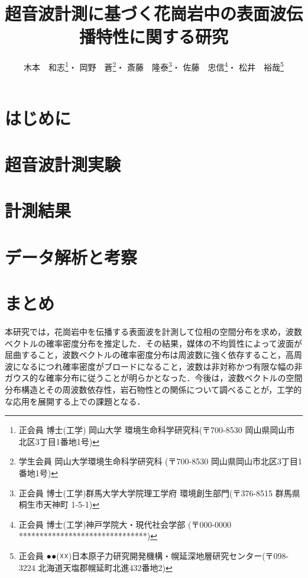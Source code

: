 \documentclass{jsce}
\title{
	超音波計測に基づく花崗岩中の表面波伝播特性に関する研究
}%
\author{木本　和志\thanks{正会員 博士(工学) 岡山大学 環境生命科学研究科(〒700-8530 岡山県岡山市北区3丁目1番地1号)\email{kimoto@cc.okayama-u.ac.jp}}・
岡野　蒼\thanks{学生会員 岡山大学環境生命科学研究科 (〒700-8530 岡山県岡山市北区3丁目1番地1号)}・
斎藤　隆泰\thanks{正会員 博士(工学)群馬大学大学院理工学府 環境創生部門(〒376-8515 群馬県桐生市天神町 1-5-1)}・
佐藤　忠信\thanks{正会員 博士(工学)神戸学院大・現代社会学部 (〒000-0000 *******************************)}・
松井　裕哉\thanks{正会員 ●●(☓☓)日本原子力研究開発機構・幌延深地層研究センター(〒098-3224 北海道天塩郡幌延町北進432番地2)}
}
\begin{document}
\maketitle
\section{はじめに}
	
\section{超音波計測実験}
	
\section{計測結果}
	
\section{データ解析と考察 }
	
\section{まとめ}
本研究では，花崗岩中を伝播する表面波を計測して位相の空間分布を求め，波数ベクトルの確率密度分布を推定した．その結果，媒体の不均質性によって波面が屈曲すること，波数ベクトルの確率密度分布は周波数に強く依存すること，高周波になるにつれ確率密度がブロードになること，波数は非対称かつ有限な幅の非ガウス的な確率分布に従うことが明らかとなった．今後は，波数ベクトルの空間分布構造とその周波数依存性，岩石物性との関係について調べることが，工学的な応用を展開する上での課題となる．
\end{document}
